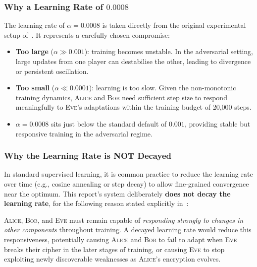 \documentclass[12pt, a4paper]{article}
\newcommand{\alice}{\textsc{Alice}}
\newcommand{\bob}{\textsc{Bob}}
\newcommand{\eve}{\textsc{Eve}}
\begin{document}
\subsubsection*{Why a Learning Rate of $0.0008$}

The learning rate of $\alpha = 0.0008$ is taken directly from the
original experimental setup of~\cite{abadi2016learning}. It represents
a carefully chosen compromise:

\begin{itemize}[leftmargin=1.8em, itemsep=4pt]
  \item \textbf{Too large} ($\alpha \gg 0.001$): training becomes
        unstable. In the adversarial setting, large updates from one
        player can destabilise the other, leading to divergence or
        persistent oscillation.
  \item \textbf{Too small} ($\alpha \ll 0.0001$): learning is too slow.
        Given the non-monotonic training dynamics, \alice{} and \bob{}
        need sufficient step size to respond meaningfully to \eve{}'s
        adaptations within the training budget of 20{,}000 steps.
  \item $\alpha = 0.0008$ sits just below the standard default of
        $0.001$, providing stable but responsive training in the
        adversarial regime.
\end{itemize}

\subsubsection*{Why the Learning Rate is NOT Decayed}

In standard supervised learning, it is common practice to reduce the
learning rate over time (e.g., cosine annealing or step decay) to
allow fine-grained convergence near the optimum. This report's system
deliberately \textbf{does not decay the learning rate}, for the
following reason stated explicitly in~\cite{abadi2016learning}:

\begin{tcolorbox}[contribbox, title={Design Rationale: No Learning Rate Decay}]
  \alice{}, \bob{}, and \eve{} must remain capable of \emph{responding
  strongly to changes in other components} throughout training. A decayed
  learning rate would reduce this responsiveness, potentially causing
  \alice{} and \bob{} to fail to adapt when \eve{} breaks their cipher
  in the later stages of training, or causing \eve{} to stop exploiting
  newly discoverable weaknesses as \alice{}'s encryption evolves.
\end{tcolorbox}
\end{document}
